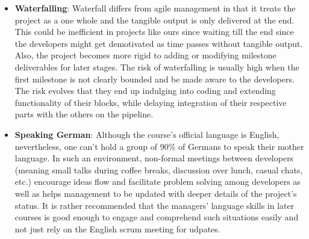 \begin{itemize}
  \item \textbf{Waterfalling}: Waterfall differs from agile management in that it treats the project as a one whole and the tangible output is only delivered at the end. This could be inefficient in projects like ours since waiting till the end since the developers might get demotivated as time passes without tangible output. Also, the project becomes more rigid to adding or modifying milestone deliverables for later stages. The risk of waterfalling is usually high when the first milestone is not clearly bounded and be made aware to the developers. The risk evolves that they end up indulging into coding and extending functionality of their blocks, while delaying integration of their respective parts with the others on the pipeline.
  \item \textbf{Speaking German}: Although the course's official language is English, nevertheless, one can't hold a group of 90\% of Germans to speak their mother language. In such an environment, non-formal meetings between developers (meaning small talks during coffee breaks, discussion over lunch, casual chats, etc.) encourage ideas flow and facilitate problem solving among developers as well as helps management to be updated with deeper details of the project's status. It is rather recommended that the managers' language skills in later courses is good enough to engage and comprehend such situations easily and not just rely on the English scrum meeting for udpates.
\end{itemize}


